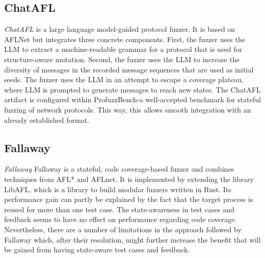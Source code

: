 \subsection{ChatAFL}
\textit{ChatAFL} \cite{chatafl} is a large language model-guided protocol fuzzer. It is based on AFLNet but integrates three concrete components. First, the fuzzer uses the LLM to extract a machine-readable grammar for a protocol that is used for structure-aware mutation. Second, the fuzzer uses the LLM to increase the diversity of messages in the recorded message sequences that are used as initial seeds. The fuzzer uses the LLM in an attempt to escape a coverage plateau, where LLM is prompted to generate messages to reach new states.
The ChatAFL artifact is configured within ProfuzzBench-a well-accepted benchmark for stateful fuzzing of network protocols. This way, this allows smooth integration with an already established format.



\subsection{Fallaway}
\textit{Fallaway} Fallaway is a stateful, code coverage-based fuzzer and combines techniques from AFL* and AFLnet. It is implemented by extending the library LibAFL, which is a library to build modular fuzzers written in Rust. Its performance gain can partly be explained by the fact that the target process is reused for more than one test case. The state-awareness in test cases and feedback seems to have no effect on performance regarding code coverage. Nevertheless, there are a number of limitations in the approach followed by Fallaway which, after their resolution, might further increase the benefit that will be gained from having state-aware test cases and feedback.

